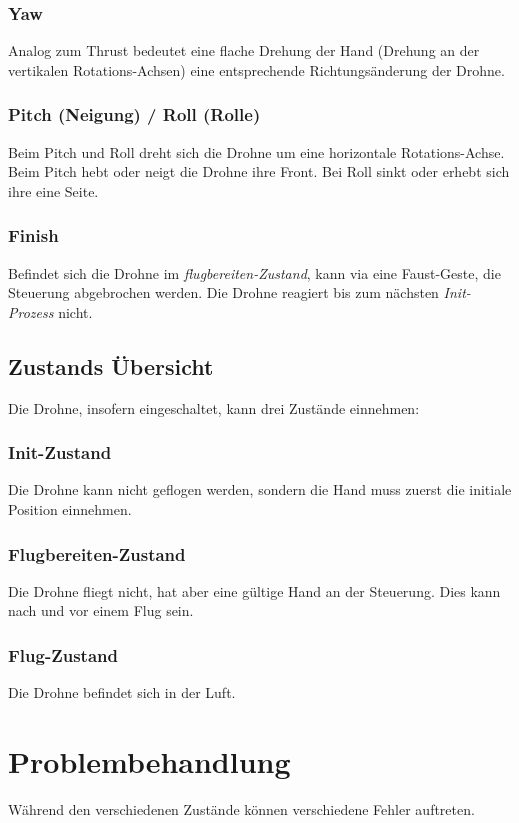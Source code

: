 \subsubsection{Yaw}
Analog zum Thrust bedeutet eine flache Drehung der Hand (Drehung an der vertikalen Rotations-Achsen) eine entsprechende Richtungsänderung der Drohne.

\subsubsection{Pitch (Neigung) / Roll (Rolle)}
Beim Pitch und Roll dreht sich die Drohne um eine horizontale Rotations-Achse. Beim Pitch hebt oder neigt die Drohne ihre Front. Bei Roll sinkt oder erhebt sich ihre eine Seite.

\subsubsection{Finish}
Befindet sich die Drohne im \textit{flugbereiten-Zustand}, kann via eine Faust-Geste, die Steuerung abgebrochen werden.
Die Drohne reagiert bis zum nächsten \textit{Init-Prozess} nicht.


\subsection{Zustands Übersicht}
Die Drohne, insofern eingeschaltet, kann drei Zustände einnehmen:

\subsubsection{Init-Zustand}
Die Drohne kann nicht geflogen werden, sondern die Hand muss zuerst die initiale Position einnehmen.

\subsubsection{Flugbereiten-Zustand}
Die Drohne fliegt nicht, hat aber eine gültige Hand an der Steuerung. Dies kann nach und vor einem Flug sein.

\subsubsection{Flug-Zustand}
Die Drohne befindet sich in der Luft.



\section{Problembehandlung}
Während den verschiedenen Zustände können verschiedene Fehler auftreten.

